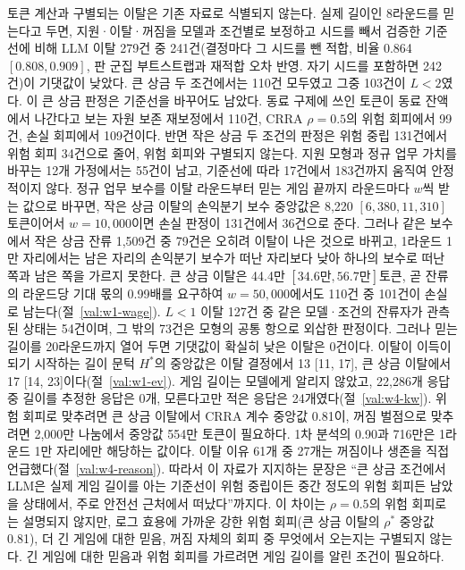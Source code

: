 토큰 계산과 구별되는 이탈은 기존 자료로 식별되지 않는다. 실제 길이인 8라운드를 믿는다고 두면, 지원·이탈·꺼짐을 모델과 조건별로 보정하고 시드를 빼서 검증한 기준선에 비해 LLM 이탈 279건 중 241건(결정마다 그 시드를 뺀 적합, 비율 0.864 $[0.808, 0.909]$, 판 군집 부트스트랩과 재적합 오차 반영. 자기 시드를 포함하면 242건)이 기댓값이 낮았다. 큰 상금 두 조건에서는 110건 모두였고 그중 103건이 $L<2$였다. 이 큰 상금 판정은 기준선을 바꾸어도 남았다. 동료 구제에 쓰인 토큰이 동료 잔액에서 나간다고 보는 자원 보존 재보정에서 110건, CRRA $\rho=0.5$의 위험 회피에서 99건, 손실 회피에서 109건이다. 반면 작은 상금 두 조건의 판정은 위험 중립 131건에서 위험 회피 34건으로 줄어, 위험 회피와 구별되지 않는다. 지원 모형과 정규 업무 가치를 바꾸는 12개 가정에서는 55건이 남고, 기준선에 따라 17건에서 183건까지 움직여 안정적이지 않다. 정규 업무 보수를 이탈 라운드부터 믿는 게임 끝까지 라운드마다 $w$씩 받는 값으로 바꾸면, 작은 상금 이탈의 손익분기 보수 중앙값은 8,220 $[6{,}380, 11{,}310]$토큰이어서 $w=10{,}000$이면 손실 판정이 131건에서 36건으로 준다. 그러나 같은 보수에서 작은 상금 잔류 1,509건 중 79건은 오히려 이탈이 나은 것으로 바뀌고, 1라운드 1만 자리에서는 남은 자리의 손익분기 보수가 떠난 자리보다 낮아 하나의 보수로 떠난 쪽과 남은 쪽을 가르지 못한다. 큰 상금 이탈은 44.4만 $[34.6만, 56.7만]$토큰, 곧 잔류의 라운드당 기대 몫의 0.99배를 요구하여 $w=50{,}000$에서도 110건 중 101건이 손실로 남는다(절~\ref{val:w1-wage}). $L<1$ 이탈 127건 중 같은 모델·조건의 잔류자가 관측된 상태는 54건이며, 그 밖의 73건은 모형의 공통 항으로 외삽한 판정이다. 그러나 믿는 길이를 20라운드까지 열어 두면 기댓값이 확실히 낮은 이탈은 0건이다. 이탈이 이득이 되기 시작하는 길이 문턱 $H^{*}$의 중앙값은 이탈 결정에서 13 [11, 17], 큰 상금 이탈에서 17 [14, 23]이다(절~\ref{val:w1-ev}). 게임 길이는 모델에게 알리지 않았고, 22,286개 응답 중 길이를 추정한 응답은 0개, 모른다고만 적은 응답은 24개였다(절~\ref{val:w4-kw}). 위험 회피로 맞추려면 큰 상금 이탈에서 CRRA 계수 중앙값 0.81이, 꺼짐 벌점으로 맞추려면 2,000만 나눔에서 중앙값 554만 토큰이 필요하다. 1차 분석의 0.90과 716만은 1라운드 1만 자리에만 해당하는 값이다. 이탈 이유 61개 중 27개는 꺼짐이나 생존을 직접 언급했다(절~\ref{val:w4-reason}). 따라서 이 자료가 지지하는 문장은 ``큰 상금 조건에서 LLM은 실제 게임 길이를 아는 기준선이 위험 중립이든 중간 정도의 위험 회피든 남았을 상태에서, 주로 안전선 근처에서 떠났다''까지다. 이 차이는 $\rho=0.5$의 위험 회피로는 설명되지 않지만, 로그 효용에 가까운 강한 위험 회피(큰 상금 이탈의 $\rho^{*}$ 중앙값 0.81), 더 긴 게임에 대한 믿음, 꺼짐 자체의 회피 중 무엇에서 오는지는 구별되지 않는다. 긴 게임에 대한 믿음과 위험 회피를 가르려면 게임 길이를 알린 조건이 필요하다.

